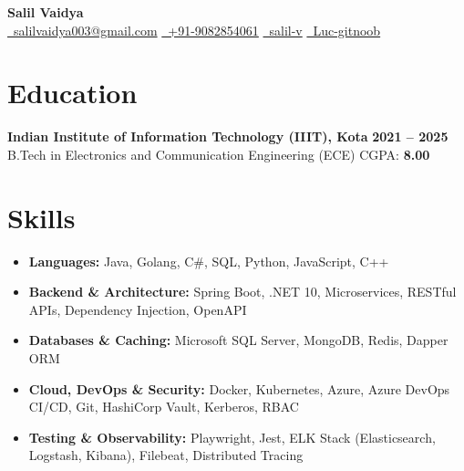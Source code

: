 \documentclass[a4paper,11pt]{article}
\begin{document}

\begin{center}
{\LARGE\textbf{Salil Vaidya}}\\[3pt]
\href{mailto:salilvaidya003@gmail.com}{\faEnvelope\ salilvaidya003@gmail.com}%
\hspace{0.9em}\textbar\hspace{0.9em}%
\href{tel:+919082854061}{\faPhone\ +91-9082854061}%
\hspace{0.9em}\textbar\hspace{0.9em}%
\href{https://linkedin.com/in/salil-v}{\faLinkedin\ salil-v}%
\hspace{0.9em}\textbar\hspace{0.9em}%
\href{https://github.com/Luc-gitnoob}{\faGithub\ Luc-gitnoob}
\end{center}
\vspace{-3pt}

\section*{Education}
\textbf{Indian Institute of Information Technology (IIIT), Kota} \hfill \textbf{2021 -- 2025} \\
B.Tech in Electronics and Communication Engineering (ECE) \hfill CGPA: \textbf{8.00}

\section*{Skills}
\begin{itemize}
 \item \textbf{Languages:} Java, Golang, C\#, SQL, Python, JavaScript, C++
 \item \textbf{Backend \& Architecture:} Spring Boot, .NET 10, Microservices, RESTful APIs, Dependency Injection, OpenAPI
 \item \textbf{Databases \& Caching:} Microsoft SQL Server, MongoDB, Redis, Dapper ORM
 \item \textbf{Cloud, DevOps \& Security:} Docker, Kubernetes, Azure, Azure DevOps CI/CD, Git, HashiCorp Vault, Kerberos, RBAC
 \item \textbf{Testing \& Observability:} Playwright, Jest, ELK Stack (Elasticsearch, Logstash, Kibana), Filebeat, Distributed Tracing
\end{itemize}

\end{document}
